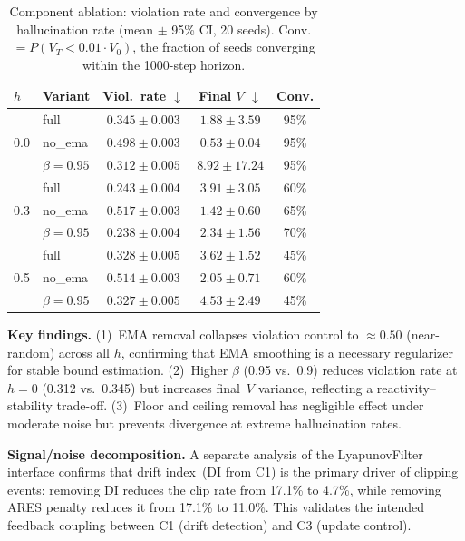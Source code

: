 \documentclass{article}
\begin{document}
\begin{table}[h]
\centering
\caption{Component ablation: violation rate and convergence by
  hallucination rate (mean $\pm$ 95\% CI, 20 seeds).
  Conv.${}= P(V_T < 0.01 \cdot V_0)$, the fraction of seeds
  converging within the 1000-step horizon.}
\label{tab:ablation}
\small
\begin{tabular}{@{}llccc@{}}
\toprule
\textbf{$h$} & \textbf{Variant} & \textbf{Viol.\ rate} $\downarrow$
  & \textbf{Final $V$} $\downarrow$ & \textbf{Conv.} \\
\midrule
\multirow{3}{*}{0.0}
  & full          & $0.345 \pm 0.003$ & $1.88 \pm 3.59$  & 95\% \\
  & no\_ema       & $0.498 \pm 0.003$ & $0.53 \pm 0.04$  & 95\% \\
  & $\beta{=}0.95$ & $0.312 \pm 0.005$ & $8.92 \pm 17.24$ & 95\% \\
\midrule
\multirow{3}{*}{0.3}
  & full          & $0.243 \pm 0.004$ & $3.91 \pm 3.05$  & 60\% \\
  & no\_ema       & $0.517 \pm 0.003$ & $1.42 \pm 0.60$  & 65\% \\
  & $\beta{=}0.95$ & $0.238 \pm 0.004$ & $2.34 \pm 1.56$  & 70\% \\
\midrule
\multirow{3}{*}{0.5}
  & full          & $0.328 \pm 0.005$ & $3.62 \pm 1.52$  & 45\% \\
  & no\_ema       & $0.514 \pm 0.003$ & $2.05 \pm 0.71$  & 60\% \\
  & $\beta{=}0.95$ & $0.327 \pm 0.005$ & $4.53 \pm 2.49$  & 45\% \\
\bottomrule
\end{tabular}
\end{table}

\textbf{Key findings.}
(1)~EMA removal collapses violation control to $\approx 0.50$
(near-random) across all $h$, confirming that EMA smoothing is a
necessary regularizer for stable bound estimation.
(2)~Higher $\beta$ (0.95 vs.\ 0.9) reduces violation rate at
$h{=}0$ (0.312 vs.\ 0.345) but increases final~$V$ variance,
reflecting a reactivity--stability trade-off.
(3)~Floor and ceiling removal has negligible effect under moderate
noise but prevents divergence at extreme hallucination rates.

\textbf{Signal/noise decomposition.}
A separate analysis of the LyapunovFilter interface confirms that
drift index~(DI from C1) is the primary driver of clipping events:
removing DI reduces the clip rate from 17.1\% to 4.7\%, while
removing ARES penalty reduces it from 17.1\% to 11.0\%.
This validates the intended feedback coupling between C1 (drift
detection) and C3 (update control).
\end{document}
